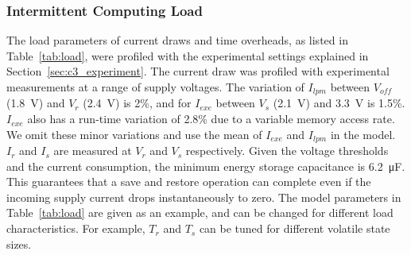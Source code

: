
\subsubsection{Intermittent Computing Load} \label{ssubsec:loadconfig}

The load parameters of current draws and time overheads, as listed in Table~\ref{tab:load}, were profiled with the experimental settings explained in Section~\ref{sec:c3_experiment}. 
The current draw was profiled with experimental measurements at a range of supply voltages. The variation of $I_{lpm}$ between $V_{off}$ (\SI{1.8}{\volt}) and $V_{r}$ (\SI{2.4}{\volt}) is 2\%, and for $I_{exe}$ between $V_{s}$ (\SI{2.1}{\volt}) and \SI{3.3}{\volt} is 1.5\%. $I_{exe}$ also has a run-time variation of 2.8\% due to a variable memory access rate. We omit these minor variations and use the mean of $I_{exe}$ and $I_{lpm}$ in the model. $I_{r}$ and $I_{s}$ are measured at $V_{r}$ and $V_{s}$ respectively. Given the voltage thresholds and the current consumption, the minimum energy storage capacitance is \SI{6.2}{\micro\farad}. This guarantees that a save and restore operation can complete even if the incoming supply current drops instantaneously to zero. The model parameters in Table~\ref{tab:load} are given as an example, and can be changed for different load characteristics. For example, $T_{r}$ and $T_{s}$ can be tuned for different volatile state sizes.

